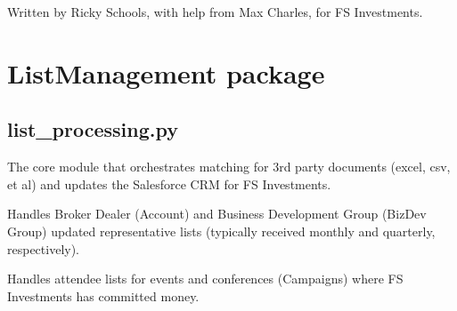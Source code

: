 \documentclass[letterpaper,10pt,english]{sphinxmanual}
\begin{document}
Written by Ricky Schools, with help from Max Charles, for FS Investments.


\chapter{ListManagement package}
\label{\detokenize{index:module-ListManagement}}\label{\detokenize{index:listmanagement-package}}\label{\detokenize{index:module-ListManagement.list_processing}}

\section{list\_processing.py}
\label{\detokenize{index:list-processing-py}}
The core module that orchestrates matching
for 3rd party documents (excel, csv, et al) and
updates the Salesforce CRM for FS Investments.

Handles Broker Dealer (Account) and Business Development
Group (BizDev Group) updated representative
lists (typically received monthly and quarterly, respectively).

Handles attendee lists for events and conferences (Campaigns)
where FS Investments has committed money.
\end{document}
